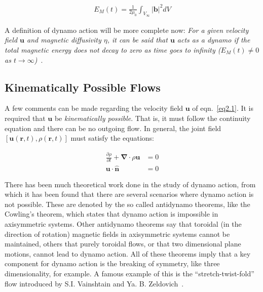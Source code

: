 \documentclass[a4paper,12pt]{article}
\begin{document}
\begin{align}
 E_M(t) = \frac{1}{2 \mu_0} \int_{V_\infty} \vert \bm b \vert^2 dV
 \label{eq2.3}
\end{align}

A definition of dynamo action will be more complete now: \textit{For a given velocity field $\bm u$ and magnetic diffusivity $\eta$, it can be said that $\bm u$ acts as a dynamo if the total magnetic energy does not decay to zero as time goes to infinity ($E_M (t) \neq 0$ as $t \rightarrow \infty$)}~\cite{schnack2009lectures}.

\subsection{Kinematically Possible Flows}

A few comments can be made regarding the velocity field $\bm u$ of eqn.~\ref{eq2.1}. It is required that $\bm u$ be \textit{kinematically possible}. That is, it must follow the continuity equation and there can be no outgoing flow. In general, the joint field $\left[ \bm u(\bm r, t), \rho(\bm r, t) \right]$ must satisfy the equations:

\begin{align}
 \frac{\partial \rho}{\partial t} + \bm \nabla \cdot \rho \bm u &= 0 \nonumber \\
 \bm u \cdot \bm{\hat{n}} &= 0 \nonumber
\end{align}


There has been much theoretical work done in the study of dynamo action, from which it has been found that there are several scenarios where dynamo action is not possible. These are denoted by the so called antidynamo theorems, like the Cowling's theorem, which states that dynamo action is impossible in axisymmetric systems. Other antidynamo theorems say that toroidal (in the direction of rotation) magnetic fields in axisymmetric systems cannot be maintained, others that purely toroidal flows, or that two dimensional plane motions, cannot lead to dynamo action. All of these theorems imply that a key component for dynamo action is the breaking of symmetry, like three dimensionality, for example. A famous example of this is the ``stretch-twist-fold'' flow introduced by S.I. Vainshtain and Ya. B. Zeldovich~\cite{schnack2009lectures}.
\end{document}

